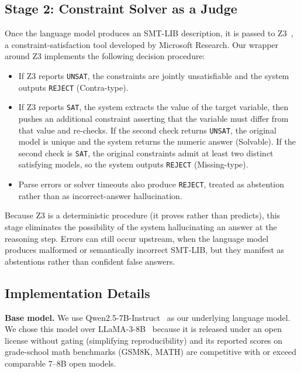 \documentclass[sigconf, nonacm, onecolumn]{acmart}
\begin{document}
\subsection{Stage 2: Constraint Solver as a Judge}

Once the language model produces an SMT-LIB description, it is passed to
Z3~\cite{demoura2008}, a constraint-satisfaction tool developed by
Microsoft Research. Our wrapper around Z3 implements the following
decision procedure:

\begin{itemize}
  \item If Z3 reports \texttt{UNSAT}, the constraints are jointly
  unsatisfiable and the system outputs \texttt{REJECT} (Contra-type).
  \item If Z3 reports \texttt{SAT}, the system extracts the value of the
  target variable, then pushes an additional constraint asserting that the
  variable must differ from that value and re-checks. If the second check
  returns \texttt{UNSAT}, the original model is unique and the system
  returns the numeric answer (Solvable). If the second check is
  \texttt{SAT}, the original constraints admit at least two distinct
  satisfying models, so the system outputs \texttt{REJECT} (Missing-type).
  \item Parse errors or solver timeouts also produce \texttt{REJECT},
  treated as abstention rather than as incorrect-answer hallucination.
\end{itemize}

Because Z3 is a deterministic procedure (it proves rather than predicts),
this stage eliminates the possibility of the system hallucinating an
answer at the reasoning step. Errors can still occur upstream, when the
language model produces malformed or semantically incorrect SMT-LIB, but
they manifest as abstentions rather than confident false answers.

\subsection{Implementation Details}
\label{sec:impl}

\textbf{Base model.} We use Qwen2.5-7B-Instruct~\cite{qwen2_5} as our
underlying language model. We chose this model over
LLaMA-3-8B~\cite{dubey2024} because it is released under an open license
without gating (simplifying reproducibility) and its reported scores on
grade-school math benchmarks (GSM8K, MATH) are competitive with or exceed
comparable 7--8B open models.
\end{document}
